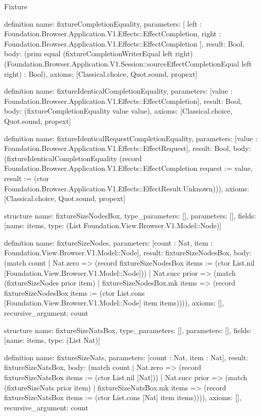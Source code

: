 \begin{lexlean}{Fixture}
\begin{semanticmodule}
definition{
  name: fixtureCompletionEquality,
  parameters: [
    left : Foundation.Browser.Application.V1.Effects::EffectCompletion,
    right : Foundation.Browser.Application.V1.Effects::EffectCompletion
  ],
  result: Bool,
  body: (prim equal (fixtureCompletionWriterEqual left right) (Foundation.Browser.Application.V1.Session::sourceEffectCompletionEqual left right) : Bool),
  axioms: [Classical.choice, Quot.sound, propext]
}

definition{
  name: fixtureIdenticalCompletionEquality,
  parameters: [value : Foundation.Browser.Application.V1.Effects::EffectCompletion],
  result: Bool,
  body: (fixtureCompletionEquality value value),
  axioms: [Classical.choice, Quot.sound, propext]
}

definition{
  name: fixtureIdenticalRequestCompletionEquality,
  parameters: [value : Foundation.Browser.Application.V1.Effects::EffectRequest],
  result: Bool,
  body: (fixtureIdenticalCompletionEquality (record Foundation.Browser.Application.V1.Effects::EffectCompletion {request := value, result := (ctor Foundation.Browser.Application.V1.Effects::EffectResult.Unknown)})),
  axioms: [Classical.choice, Quot.sound, propext]
}

structure{
  name: fixtureSizeNodesBox,
  type_parameters: [],
  parameters: [],
  fields: [{name: items, type: (List Foundation.View.Browser.V1.Model::Node)}]
}

definition{
  name: fixtureSizeNodes,
  parameters: [count : Nat, item : Foundation.View.Browser.V1.Model::Node],
  result: fixtureSizeNodesBox,
  body: (match count
    | Nat.zero => (record fixtureSizeNodesBox {items := (ctor List.nil [Foundation.View.Browser.V1.Model::Node])})
    | Nat.succ prior => (match (fixtureSizeNodes prior item)
      | fixtureSizeNodesBox.mk items => (record fixtureSizeNodesBox {items := (ctor List.cons [Foundation.View.Browser.V1.Model::Node] item items)}))),
  axioms: [],
  recursive_argument: count
}

structure{
  name: fixtureSizeNatsBox,
  type_parameters: [],
  parameters: [],
  fields: [{name: items, type: (List Nat)}]
}

definition{
  name: fixtureSizeNats,
  parameters: [count : Nat, item : Nat],
  result: fixtureSizeNatsBox,
  body: (match count
    | Nat.zero => (record fixtureSizeNatsBox {items := (ctor List.nil [Nat])})
    | Nat.succ prior => (match (fixtureSizeNats prior item)
      | fixtureSizeNatsBox.mk items => (record fixtureSizeNatsBox {items := (ctor List.cons [Nat] item items)}))),
  axioms: [],
  recursive_argument: count
}


\end{semanticmodule}
\end{lexlean}
